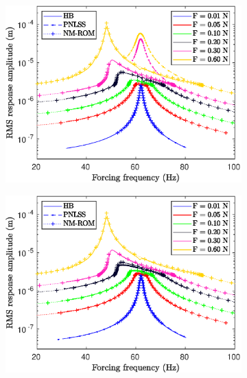\documentclass[aspectratio=169]{beamer}
\begin{document}
\begin{frame}[allowframebreaks]
  \begin{figure}[!h]
    \centering
    \begin{subfigure}{0.2\linewidth}
      \includegraphics[width=\linewidth]{../../benchmark4/extabs_fig/b4_fresp_comp_famp001_nx23}
    \end{subfigure}%
    \begin{subfigure}{0.2\linewidth}
      \includegraphics[width=\linewidth]{../../benchmark4/extabs_fig/b4_fresp_comp_famp01_nx23}
    \end{subfigure}%
    \begin{subfigure}{0.2\linewidth}

\end{subfigure}
\end{figure}
\end{frame}
\end{document}
